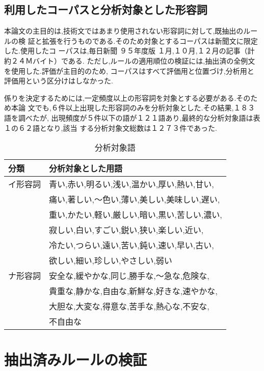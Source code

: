 \subsection{利用したコーパスと分析対象とした形容詞}

本論文の主目的は,技術文ではあまり使用されない形容詞に対して,既抽出のルールの検
証と拡張を行うものである.そのため対象とするコーパスは新聞文に限定した.使用したコ
ーパスは,毎日新聞 ９５年度版 １月,１０月,１２月の記事（計約２４Ｍバイト）である.
ただし,ルールの適用順位の検証には,抽出済の全例文を使用した.評価が主目的のため,
コーパスはすべて評価用と位置づけ,分析用と評価用という区分けはしなかった.

係りを決定するためには,一定頻度以上の形容詞を対象とする必要がある.そのため本論
文でも,６件以上出現した形容詞のみを分析対象とした.その結果,１８３語を調べたが,
出現頻度が５件以下の語が１２１語あり,最終的な分析対象語は表１の６２語となり,該当
する分析対象文総数は１２７３件であった.

\begin{table}[h]
\caption{分析対象語}
\begin{center}
  \begin{tabular}{|l|l|} \hline
    分類 & 分析対象とした用語 \\ \hline
    イ形容詞 & 青い,赤い,明るい,浅い,温かい,厚い,熱い,甘い,\\
    & 痛い,著しい,〜色い,薄い,美しい,美味しい,遅い,\\
    & 重い,かたい,軽い,厳しい,暗い,黒い,苦しい,濃い,\\
    & 寂しい,白い,すごい,鋭い,狭い,楽しい,近い,\\
    & 冷たい,つらい,遠い,苦い,鈍い,速い,早い,古い,\\
    & 欲しい,細い,珍しい,やさしい,弱い\\ \hline
    ナ形容詞 & 安全な,緩やかな,同じ,勝手な,〜急な,危険な,\\
    & 貴重な,静かな,自由な,新鮮な,好きな,速やかな,\\
    & 大胆な,大変な,得意な,苦手な,熱心な,不安な,\\
    & 不自由な\\ \hline
  \end{tabular}
\end{center}
\end{table}


\section{抽出済みルールの検証}

